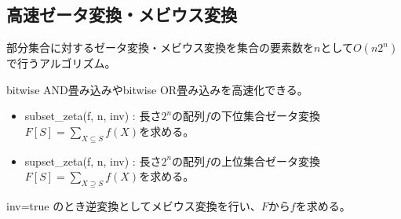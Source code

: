 \subsection{高速ゼータ変換・メビウス変換}

部分集合に対するゼータ変換・メビウス変換を集合の要素数を$n$として$O(n2^n)$で行うアルゴリズム。

bitwise AND畳み込みやbitwise OR畳み込みを高速化できる。

\begin{itemize}
    \item subset\_zeta(f, n, inv) : 長さ$2^n$の配列$f$の下位集合ゼータ変換$F[S] = \sum_{X \subseteq S} f(X)$を求める。
    \item supset\_zeta(f, n, inv) : 長さ$2^n$の配列$f$の上位集合ゼータ変換$F[S] = \sum_{X \supseteq S} f(X)$を求める。
\end{itemize}

inv=true のとき逆変換としてメビウス変換を行い、$F$から$f$を求める。

